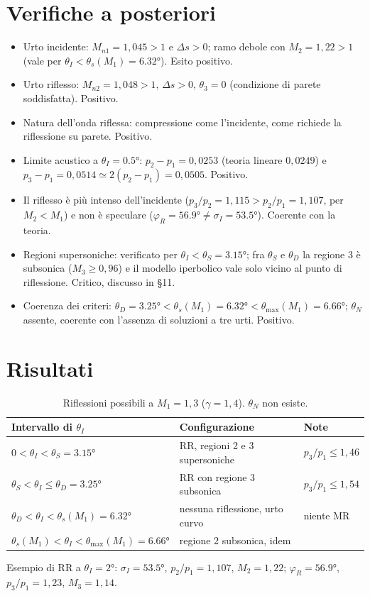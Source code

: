 \documentclass[11pt,a4paper]{article}
\begin{document}
\section{Verifiche a posteriori}
\begin{itemize}
\item Urto incidente: $M_{n1}=1{,}045>1$ e $\Delta s>0$; ramo debole con $M_2=1{,}22>1$ (vale per
  $\theta_I<\theta_s(M_1)=\ang{6.32}$). Esito positivo.
\item Urto riflesso: $M_{n2}=1{,}048>1$, $\Delta s>0$, $\theta_3=0$ (condizione di parete soddisfatta). Positivo.
\item Natura dell'onda riflessa: compressione come l'incidente, come richiede la riflessione su parete. Positivo.
\item Limite acustico a $\theta_I=\ang{0.5}$: $p_2-p_1=0{,}0253$ (teoria lineare $0{,}0249$) e
  $p_3-p_1=0{,}0514\simeq2(p_2-p_1)=0{,}0505$. Positivo.
\item Il riflesso è più intenso dell'incidente ($p_3/p_2=1{,}115>p_2/p_1=1{,}107$, per $M_2<M_1$) e non è
  speculare ($\varphi_R=\ang{56.9}\ne\sigma_I=\ang{53.5}$). Coerente con la teoria.
\item Regioni supersoniche: verificato per $\theta_I<\theta_S=\ang{3.15}$; fra $\theta_S$ e $\theta_D$ la regione 3 è
  subsonica ($M_3\ge0{,}96$) e il modello iperbolico vale solo vicino al punto di riflessione. Critico, discusso
  in §11.
\item Coerenza dei criteri: $\theta_D=\ang{3.25}<\theta_s(M_1)=\ang{6.32}<\theta_{\max}(M_1)=\ang{6.66}$; $\theta_N$
  assente, coerente con l'assenza di soluzioni a tre urti. Positivo.
\end{itemize}

\section{Risultati}
\begin{table}[H]
  \centering
  \begin{tabular}{lll}
    \toprule
    Intervallo di $\theta_I$ & Configurazione & Note \\
    \midrule
    $0<\theta_I<\theta_S=\ang{3.15}$ & RR, regioni 2 e 3 supersoniche & $p_3/p_1\le1{,}46$ \\
    $\theta_S<\theta_I\le\theta_D=\ang{3.25}$ & RR con regione 3 subsonica & $p_3/p_1\le1{,}54$ \\
    $\theta_D<\theta_I<\theta_s(M_1)=\ang{6.32}$ & nessuna riflessione, urto curvo & niente MR \\
    $\theta_s(M_1)<\theta_I<\theta_{\max}(M_1)=\ang{6.66}$ & regione 2 subsonica, idem & \\
    \bottomrule
  \end{tabular}
  \caption{Riflessioni possibili a $M_1=1{,}3$ ($\gamma=1{,}4$). $\theta_N$ non esiste.}
\end{table}
Esempio di RR a $\theta_I=\ang{2}$: $\sigma_I=\ang{53.5}$, $p_2/p_1=1{,}107$, $M_2=1{,}22$; $\varphi_R=\ang{56.9}$,
$p_3/p_1=1{,}23$, $M_3=1{,}14$.
\end{document}

